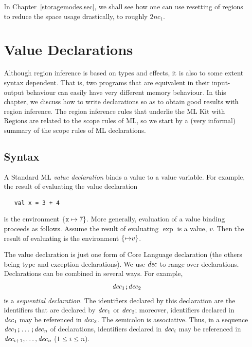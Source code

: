 \documentclass[12pt]{book}
\begin{document}
In Chapter~\ref{storagemodes.sec}, we shall see how one can use
resetting of regions to reduce the space usage drastically, to roughly
$2nc_1$.  
%

\chapter{Value Declarations}
\label{valdecl.sec}

Although region inference is based on types and effects, it is also to
some extent syntax dependent. That is, two programs that are
equivalent in their input-output behaviour can easily have very
different memory behaviour. In this chapter, we discuss how to write
%
declarations so as to obtain good results with region inference. The
region inference rules that underlie the ML Kit with Regions are
related to the scope rules of ML, so we start by a (very informal)
summary of the scope rules of ML declarations.

\section{Syntax}
A Standard ML {\em value declaration} binds a value to a value
%
variable. For example, the result of evaluating the value declaration
\begin{verbatim}
   val x = 3 + 4
\end{verbatim}
is the 
%
environment $\{\hbox{\tt x}\mapsto 7\}$. More generally, evaluation of a
value binding  proceeds as follows. Assume
the result of evaluating $\exp$ is a value, $v$.  Then the result of
evaluating  is the environment $\{{\it \mapsto}
v\}$.

The value declaration is just one form of Core Language declaration 
(the others being type and exception declarations). We use ${\it dec}$ to
range over declarations. Declarations can be
combined in several ways. For example, 
%
$${\it dec}_1\hbox{\tt ;}{\it dec}_2$$
is a {\em sequential declaration}. The
identifiers declared by this declaration are the identifiers that are
declared by ${\it dec}_1$ or ${\it dec}_2$; moreover, identifiers declared in
${\it dec}_1$ may be referenced in ${\it dec}_2$. The
%
semicolon is associative. Thus, in a sequence
${\it dec}_1\hbox{\tt ;}\ldots\hbox{\tt ;}{\it dec}_n$ of declarations, identifiers
declared in ${\it dec}_i$ may be referenced in ${\it dec}_{i+1},\ldots ,{\it dec}_n$
($1\leq i\leq n$).
\end{document}

